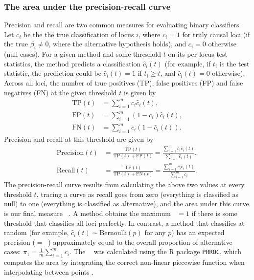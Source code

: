 \documentclass[12pt]{article}
\DeclareMathOperator{\auc}{\text{AUC}_\text{PR}}
\begin{document}
\subsubsection{The area under the precision-recall curve}

Precision and recall are two common measures for evaluating binary classifiers.
Let $c_i$ be the the true classification of locus $i$, where $c_i = 1$ for truly causal loci (if the true $\beta_i \ne 0$, where the alternative hypothesis holds), and $c_i = 0$ otherwise (null cases).
For a given method and some threshold $t$ on its per-locus test statistics, the method predicts a classification $\hat{c}_i(t)$ (for example, if $t_i$ is the test statistic, the prediction could be $\hat{c}_i(t) = 1$ if $t_i \ge t$, and $\hat{c}_i(t) = 0$ otherwise).
Across all loci, the number of true positives (TP), false positives (FP) and false negatives (FN) at the given threshold $t$ is given by
\begin{align*}
  \text{TP}(t)
  &=
    \sum_{i = 1}^m c_i \hat{c}_i(t)
    , \\
  \text{FP}(t)
  &=
    \sum_{i = 1}^m (1 - c_i) \hat{c}_i(t)
    , \\
  \text{FN}(t)
  &=
    \sum_{i = 1}^m c_i \left( 1 - \hat{c}_i(t) \right)
    .
\end{align*}
Precision and recall at this threshold are given by
\begin{align*}
  \text{Precision}(t)
  &=
    \frac{ \text{TP}(t) }{ \text{TP}(t) + \text{FP}(t) }
    =
    \frac{ \sum_{i = 1}^m c_i \hat{c}_i(t) }{ \sum_{i = 1}^m \hat{c}_i(t) }
    , \\
  \text{Recall}(t)
  &=
    \frac{ \text{TP}(t) }{ \text{TP}(t) + \text{FN}(t) }
    =
    \frac{ \sum_{i = 1}^m c_i \hat{c}_i(t) }{ \sum_{i = 1}^m c_i }
    .
\end{align*}
The precision-recall curve results from calculating the above two values at every threshold $t$, tracing a curve as recall goes from zero (everything is classified as null) to one (everything is classified as alternative), and the area under this curve is our final measure $\auc$.
A method obtains the maximum $\auc = 1$ if there is some threshold that classifies all loci perfectly.
In contrast, a method that classifies at random (for example, $\hat{c}_i(t) \sim \text{Bernoulli}(p)$ for any $p$) has an expected precision ($= \auc$) approximately equal to the overall proportion of alternative cases:
$\pi_1 = \frac{1}{m} \sum_{i = 1}^m c_i$.
The $\auc$ was calculated using the R package \texttt{PRROC}, which computes the area by integrating the correct non-linear piecewise function when interpolating between points \citep{grau_prroc:_2015}.
\end{document}
